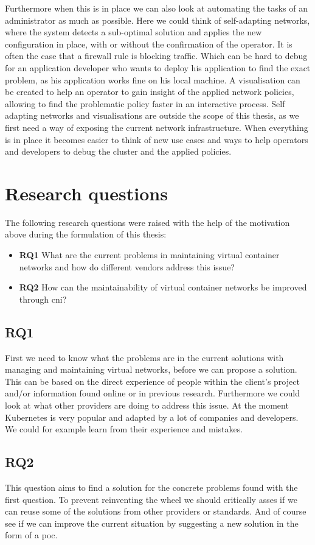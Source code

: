 Furthermore when this is in place we can also look at automating the tasks of an administrator as much as possible. Here we could think of self-adapting networks, where the system detects a sub-optimal solution and applies the new configuration in place, with or without the confirmation of the operator. It is often the case that a firewall rule is blocking traffic. Which can be hard to debug for an application developer who wants to deploy his application to find the exact problem, as his application works fine on his local machine. A visualisation can be created to help an operator to gain insight of the applied network policies, allowing to find the problematic policy faster in an interactive process. Self adapting networks and visualisations are outside the scope of this thesis, as we first need a way of exposing the current network infrastructure. When everything is in place it becomes easier to think of new use cases and ways to help operators and developers to debug the cluster and the applied policies.

\section{Research questions}
\label{sec:research-questions}
The following research questions were raised with the help of the motivation above during the formulation of this thesis:
\begin{itemize}
    \item \textbf{RQ1} What are the current problems in maintaining virtual container networks and how do different vendors address this issue?
    \item \textbf{RQ2} How can the maintainability of virtual container networks be improved through \gls{cni}?   
\end{itemize}

\subsection{RQ1}
\label{subsec:rq1}
First we need to know what the problems are in the current solutions with managing and maintaining virtual networks, before we can propose a solution. This can be based on the direct experience of people within the client's project and/or information found online or in previous research. Furthermore we could look at what other providers are doing to address this issue. At the moment Kubernetes is very popular and adapted by a lot of companies and developers. We could for example learn from their experience and mistakes.

\subsection{RQ2}
\label{subsec:rq2}
This question aims to find a solution for the concrete problems found with the first question. To prevent reinventing the wheel we should critically asses if we can reuse some of the solutions from other providers or standards. And of course see if we can improve the current situation by suggesting a new solution in the form of a \gls{poc}.
